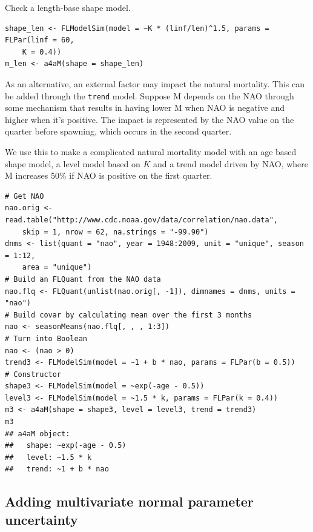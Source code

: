 \documentclass[a4paper,english,10pt]{article}\usepackage[]{graphicx}\usepackage[]{color}
\makeatletter
\newenvironment{kframe}{%
 \def\at@end@of@kframe{}%
 \ifinner\ifhmode%
  \def\at@end@of@kframe{\end{minipage}}%
  \begin{minipage}{\columnwidth}%
 \fi\fi%
 \def\FrameCommand##1{\hskip\@totalleftmargin \hskip-\fboxsep
 \colorbox{shadecolor}{##1}\hskip-\fboxsep
     \hskip-\linewidth \hskip-\@totalleftmargin \hskip\columnwidth}%
 \MakeFramed {\advance\hsize-\width
   \@totalleftmargin\z@ \linewidth\hsize
   \@setminipage}}%
 {\par\unskip\endMakeFramed%
 \at@end@of@kframe}
\newenvironment{knitrout}{}{} %
\newcommand{\code}[1]{{\texttt{#1}}}
\makeatother
\begin{document}
Check a length-base shape model.

\begin{knitrout}
\color{fgcolor}\begin{kframe}
\begin{verbatim}
shape_len <- FLModelSim(model = ~K * (linf/len)^1.5, params = FLPar(linf = 60, 
    K = 0.4))
m_len <- a4aM(shape = shape_len)
\end{verbatim}
\end{kframe}
\end{knitrout}


As an alternative, an external factor may impact the natural mortality. This can be added through the \code{trend} model. Suppose M depends on the NAO through some mechanism that results in having lower M when NAO is negative and higher when it's positive. The impact is represented by the NAO value on the quarter before spawning, which occurs in the second quarter. 

We use this to make a complicated natural mortality model with an age based shape model, a level model based on $K$ and a trend model driven by NAO, where M increases 50\% if NAO is positive on the first quarter.

\begin{knitrout}
\color{fgcolor}\begin{kframe}
\begin{verbatim}
# Get NAO
nao.orig <- read.table("http://www.cdc.noaa.gov/data/correlation/nao.data", 
    skip = 1, nrow = 62, na.strings = "-99.90")
dnms <- list(quant = "nao", year = 1948:2009, unit = "unique", season = 1:12, 
    area = "unique")
# Build an FLQuant from the NAO data
nao.flq <- FLQuant(unlist(nao.orig[, -1]), dimnames = dnms, units = "nao")
# Build covar by calculating mean over the first 3 months
nao <- seasonMeans(nao.flq[, , , 1:3])
# Turn into Boolean
nao <- (nao > 0)
trend3 <- FLModelSim(model = ~1 + b * nao, params = FLPar(b = 0.5))
# Constructor
shape3 <- FLModelSim(model = ~exp(-age - 0.5))
level3 <- FLModelSim(model = ~1.5 * k, params = FLPar(k = 0.4))
m3 <- a4aM(shape = shape3, level = level3, trend = trend3)
m3
## a4aM object:
##   shape: ~exp(-age - 0.5)
##   level: ~1.5 * k
##   trend: ~1 + b * nao
\end{verbatim}
\end{kframe}
\end{knitrout}


\subsection{Adding multivariate normal parameter uncertainty}
\end{document}
